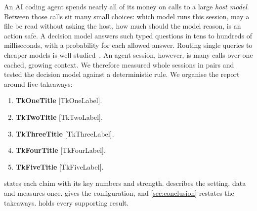 \documentclass[11pt,letterpaper]{article}
\newcommand{\term}[1]{\emph{#1}}
\newcommand{\TkTitle}[1]{\csname Tk#1Title\endcsname}
\newcommand{\TkLabel}[1]{\textsf{\small\color{okblue!70!black}[\csname Tk#1Label\endcsname]}}
\begin{document}
An AI coding agent spends nearly all of its money on calls to a large \term{host model}. Between those calls sit many
small choices: which model runs this session, may a file be read without asking the host, how much should the model
reason, is an action safe. A decision model answers such typed questions in tens to hundreds of milliseconds, with a probability for each
allowed answer. Routing single queries to cheaper models is well studied~\cite{routellm,frugalgpt}. An agent session, however, is many
calls over one cached, growing context. We therefore measured whole sessions in pairs and tested the decision model
against a deterministic rule. We organise the report around five takeaways:
\begin{enumerate}[leftmargin=1.6em, itemsep=0pt, topsep=2pt]
  \item \textbf{\TkTitle{One}} \TkLabel{One}.
  \item \textbf{\TkTitle{Two}} \TkLabel{Two}.
  \item \textbf{\TkTitle{Three}} \TkLabel{Three}.
  \item \textbf{\TkTitle{Four}} \TkLabel{Four}.
  \item \textbf{\TkTitle{Five}} \TkLabel{Five}.
\end{enumerate}
 states each claim with its key numbers and strength.  describes the setting, data and measures once.  gives the configuration, and
\cref{sec:conclusion} restates the takeaways. \Thesupp{} holds every supporting result.
\end{document}
